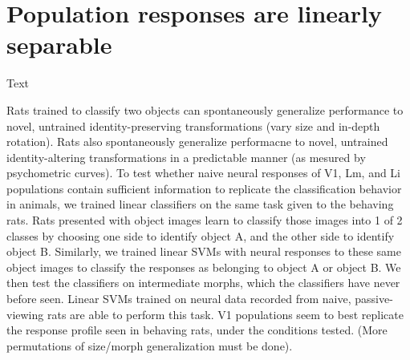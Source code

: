 \section{Population responses are linearly separable}
Text



Rats trained to classify two objects can spontaneously generalize performance to novel, untrained identity-preserving transformations (vary size and in-depth rotation). Rats also spontaneously generalize performacne to novel, untrained identity-altering transformations in a predictable manner (as mesured by psychometric curves). To test whether naive neural responses of V1, Lm, and Li populations contain sufficient information to replicate the classification behavior in animals, we trained linear classifiers on the same task given to the behaving rats. Rats presented with object images learn to classify those images into 1 of 2 classes by  choosing one side to identify object A, and the other side to identify object B. Similarly, we trained linear SVMs with neural responses to these same object images to classify the responses as belonging to object A or object B. We then test the classifiers on intermediate morphs, which the classifiers have never before seen. Linear SVMs trained on neural data recorded from naive, passive-viewing rats are able to perform this task. V1 populations seem to best replicate the response profile seen in behaving rats, under the conditions tested. (More permutations of size/morph generalization must be done). 